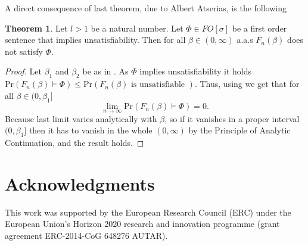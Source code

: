 \documentclass[12pt,notitlepage,a4paper]{article}
\theoremstyle{definition}
\newtheorem{theorem}{Theorem}[section]
\newcommand{\Ln}{\lim\limits_{n\to \infty}}
\newcommand{\PR}[1]{\mathrm{Pr}\left(#1\right)}
\begin{document}
A direct consequence of last theorem, due to Albert Atserias, is the following

\begin{theorem} \label{thm:satapplication}
	Let $l>1$ be a natural number. Let $\Phi\in FO[\sigma]$ be a first order
	sentence that implies unsatisfiability.  Then for all $\beta\in (0,\infty)$
	a.a.s $F_n(\beta)$ does not satisfy $\Phi$.
\end{theorem}
\begin{proof}
	Let $\beta_1$ and $\beta_2$ be as in . 
	As $\Phi$ implies unsatisfiability it holds
	$\PR{F_n(\beta)\models \Phi  }\leq  
	\PR{F_n(\beta) \text{ is unsatisfiable }  }$. Thus, using 
	we get that for all $\beta\in (0,\beta_1]$
	\[
	\Ln \PR{F_n(\beta)\models \Phi  }=0.
	\]
	Because  last limit varies analytically with $\beta$, so
	if it vanishes in a proper interval $(0,\beta_1]$ then it has to vanish
	in the whole $(0,\infty)$ by the Principle of Analytic Continuation, and the result 
	holds. 
\end{proof}




\section*{Acknowledgments}
This work was supported by the European Research Council (ERC) under the European Union's 
Horizon 2020 research and innovation programme (grant agreement ERC-2014-CoG 648276 AUTAR).\par
{}



	
\end{document}
